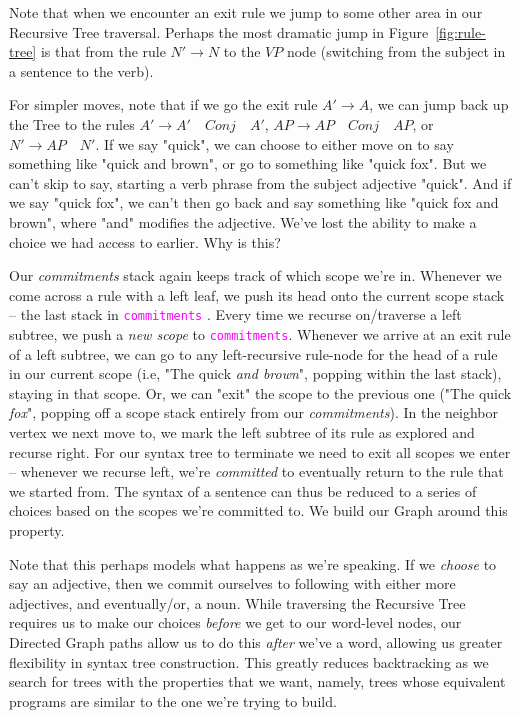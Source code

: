 \documentclass[runningheads]{llncs}
\newcommand{\code}[1]{\texttt{\textcolor{magenta}{\setlength{\fboxsep}{1pt}\colorbox{lightgray!20}{#1}}}}
\begin{document}
Note that when we encounter an exit rule we jump to some other area in our Recursive Tree traversal. Perhaps the most dramatic jump in Figure~\ref{fig:rule-tree} is that from the rule \mbox{$N' \rightarrow N$} to the $VP$ node (switching from the subject in a sentence to the verb).

For simpler moves, note that if we go the exit rule $A' \rightarrow  A$, we can jump back up the Tree to the rules \mbox{$A' \rightarrow A' \quad Conj \quad A'$}, \mbox{$AP \rightarrow AP \quad Conj \quad AP$}, or \mbox{$N' \rightarrow AP \quad N'$}. If we say "quick", we can choose to either move on to say something like "quick and brown", or go to something like "quick fox". But we can't skip to say, starting a verb phrase from the subject adjective "quick". And if we say "quick fox", we can't then go back and say something like "quick fox and brown", where "and" modifies the adjective. We've lost the ability to make a choice we had access to earlier. Why is this?

Our \textit{commitments} stack again keeps track of which scope we're in. Whenever we come across a rule with a left leaf, we push its head onto the current scope stack --  the last stack in \code{commitments} . Every time we recurse on/traverse a left subtree, we push a \textit{new scope} to \code{commitments}. Whenever we arrive at an exit rule of a left subtree, we can go to any left-recursive rule-node for the head of a rule in our current scope (i.e, "The quick \textit{and brown}", popping within the last stack), staying in that scope. Or, we can "exit" the scope to the previous one ("The quick \textit{fox}", popping off a scope stack entirely from our \textit{commitments}). In the neighbor vertex we next move to, we mark the left subtree of its rule as explored and recurse right. For our syntax tree to terminate we need to exit all scopes we enter -- whenever we recurse left, we're \textit{committed} to eventually return to the rule that we started from. The syntax of a sentence can thus be reduced to a series of choices based on the scopes we're committed to. We build our Graph around this property.

Note that this perhaps models what happens as we're speaking. If we \textit{choose} to say an adjective, then we commit ourselves to following with either more adjectives, and eventually/or, a noun. While traversing the Recursive Tree requires us to make our choices \textit{before} we get to our word-level nodes, our Directed Graph paths allow us to do this \textit{after} we've a word, allowing us greater flexibility in syntax tree construction. This greatly reduces backtracking as we search for trees with the properties that we want, namely, trees whose equivalent programs are similar to the one we're trying to build.
\end{document}
